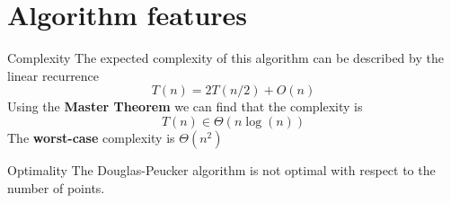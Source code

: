 \documentclass[10pt]{beamer}
\begin{document}
\section{Algorithm features}

\begin{frame}{Complexity}
	The expected complexity of this algorithm can be described by the linear recurrence
	$$
		T(n) = 2 T(n/2)+O(n)
	$$
	Using the \textbf{Master Theorem} we can find that the complexity is
	$$
		T(n) \in \Theta(n \log(n))
	$$ 
	The \textbf{worst-case} complexity is $\Theta(n^2)$	  
\end{frame}

\begin{frame}{Optimality}
	The Douglas-Peucker algorithm is not optimal with respect to the number of points.
	\begin{figure}[h]
		\begin{minipage}[h]{0.49\linewidth}
		\end{minipage}
		\hfill
		\begin{minipage}[h]{0.49\linewidth}

\end{minipage}
\end{figure}
\end{frame}
\end{document}
